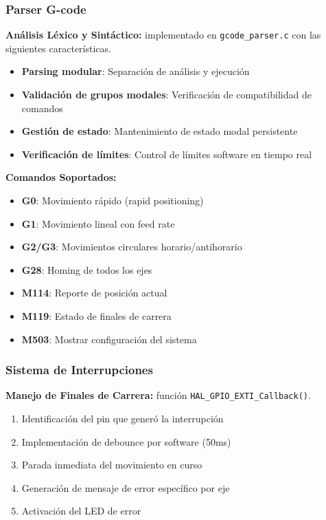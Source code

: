 \documentclass[12pt]{article}
\begin{document}
\subsubsection{Parser G-code}

\textbf{Análisis Léxico y Sintáctico:} implementado en \texttt{gcode\_parser.c} con las siguientes características.

\begin{itemize}
    \item \textbf{Parsing modular}: Separación de análisis y ejecución
    \item \textbf{Validación de grupos modales}: Verificación de compatibilidad de comandos
    \item \textbf{Gestión de estado}: Mantenimiento de estado modal persistente
    \item \textbf{Verificación de límites}: Control de límites software en tiempo real
\end{itemize}

\textbf{Comandos Soportados:}
\begin{itemize}
    \item \textbf{G0}: Movimiento rápido (rapid positioning)
    \item \textbf{G1}: Movimiento lineal con feed rate
    \item \textbf{G2/G3}: Movimientos circulares horario/antihorario
    \item \textbf{G28}: Homing de todos los ejes
    \item \textbf{M114}: Reporte de posición actual
    \item \textbf{M119}: Estado de finales de carrera
    \item \textbf{M503}: Mostrar configuración del sistema
\end{itemize}

\subsubsection{Sistema de Interrupciones}

\textbf{Manejo de Finales de Carrera:} función \texttt{HAL\_GPIO\_EXTI\_Callback()}.

\begin{enumerate}
    \item Identificación del pin que generó la interrupción
    \item Implementación de debounce por software (50ms)
    \item Parada inmediata del movimiento en curso
    \item Generación de mensaje de error específico por eje
    \item Activación del LED de error
\end{enumerate}
\end{document}
